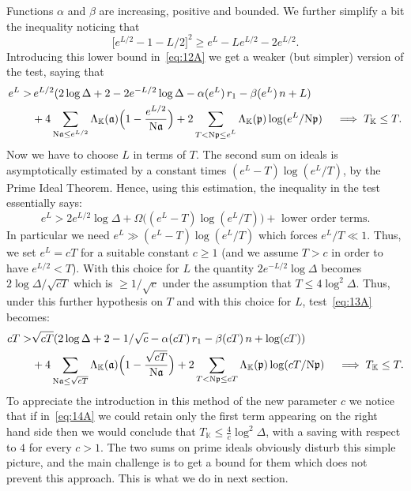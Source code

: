 \documentclass[a4paper,11pt]{amsart}
\newcommand{\field}[1]{\mathbb{{#1}}}
\newcommand{\ideal}[1]{\mathfrak{{#1}}}
\newcommand{\K}{\field{{K}}}
\newcommand{\p}{\ideal{p}}
\renewcommand{\a}{\ideal{a}}
\newcommand{\Norm}{\textrm{\upshape N}}
\theoremstyle{remark}
\begin{document}
Functions $\alpha$ and $\beta$ are increasing, positive and bounded.
%
%
We further simplify a bit the inequality noticing that
%
\[
\big[e^{L/2} - 1 - L/2\big]^2 \geq e^L - Le^{L/2} - 2 e^{L/2}.
\]
Introducing this lower bound in~\eqref{eq:12A} we get a weaker (but simpler) version of the test, saying
that
\begin{align}
e^L
>\,&  e^{L/2}(2\log \Delta + 2 - 2e^{-L/2}\log \Delta - \alpha(e^L)\,r_1 - \beta(e^L)\,n +L)    \notag \\
   &\!+ 4 \sum_{\Norm\a\leq e^{L/2}} \Lambda_{\K}(\a)\Big(1 - \frac{e^{L/2}}{\Norm\a}\Big)
      + 2\sum_{\substack{T< \Norm\p \leq e^L}} \Lambda_{\K}(\p)\log(e^L/\Norm\p)
\quad
\implies T_\K \leq T.                                                                           \label{eq:13A}
\end{align}
%
Now we have to choose $L$ in terms of $T$. The second sum on ideals is asymptotically estimated by a
constant times $(e^L-T)\log(e^L/T)$, by the Prime Ideal Theorem. Hence, using this estimation, the
inequality in the test essentially says:
\[
e^L
>  2e^{L/2}\log \Delta
   + \Omega\big((e^L-T)\log(e^L/T)\big)
   + \text{ lower order terms}.
\]
In particular we need $e^L \gg (e^L-T)\log(e^L/T)$ which forces $e^L/T \ll 1$. Thus, we set $e^L=cT$ for
a suitable constant $c\geq 1$ (and we assume $T > c$ in order to have $e^{L/2}<T$). With this choice for
$L$ the quantity $2e^{-L/2}\log \Delta$ becomes $2\log \Delta/\sqrt{cT}$ which is $\geq 1/\sqrt{c}$ under
the assumption that $T \leq 4\log^2\Delta$. Thus, under this further hypothesis on $T$ and with this
choice for $L$, test~\eqref{eq:13A} becomes:
\begin{align}
cT
>&  \sqrt{cT}(2\log \Delta + 2  - 1/\sqrt{c} - \alpha(cT)\,r_1 - \beta(cT)\,n + \log(cT))       \notag \\
&  + 4\sum_{\Norm\a\leq \sqrt{cT}} \Lambda_{\K}(\a)\Big(1 - \frac{\sqrt{cT}}{\Norm\a}\Big)
   + 2\sum_{\substack{T< \Norm\p \leq cT}} \Lambda_{\K}(\p)\log(cT/\Norm\p)
\quad
\implies T_\K \leq T.                                                                           \label{eq:14A}
\end{align}
%
To appreciate the introduction in this method of the new parameter $c$ we notice that if in~\eqref{eq:14A}
we could retain only the first term appearing on the right hand side then we would conclude that $T_\K
\leq \frac{4}{c} \log^2\Delta$, with a saving with respect to $4$ for every $c > 1$. The two sums on
prime ideals obviously disturb this simple picture, and the main challenge is to get a bound for them
which does not prevent this approach. This is what we do in next section.
%
\end{document}
